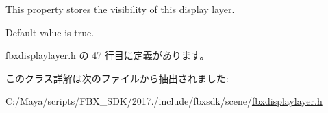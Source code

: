This property stores the visibility of this display layer.

Default value is true. 

 fbxdisplaylayer.\+h の 47 行目に定義があります。



このクラス詳解は次のファイルから抽出されました\+:\begin{DoxyCompactItemize}
\item 
C\+:/\+Maya/scripts/\+F\+B\+X\+\_\+\+S\+D\+K/2017./include/fbxsdk/scene/\hyperlink{fbxdisplaylayer_8h}{fbxdisplaylayer.\+h}\end{DoxyCompactItemize}
